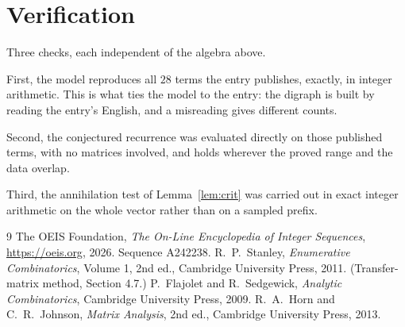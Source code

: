 \documentclass[11pt,a4paper]{article}
\theoremstyle{plain}
\theoremstyle{definition}
\begin{document}
\section{Verification}

Three checks, each independent of the algebra above.

First, the model reproduces all $28$ terms the entry publishes, exactly, in integer
arithmetic. This is what ties the model to the entry: the digraph is built by reading the
entry's English, and a misreading gives different counts.

Second, the conjectured recurrence was evaluated directly on those published terms, with no
matrices involved, and holds wherever the proved range and the data overlap.

Third, the annihilation test of Lemma~\ref{lem:crit} was carried out in exact integer
arithmetic on the whole vector rather than on a sampled prefix.

\begin{thebibliography}{9}
 The OEIS Foundation, \emph{The On-Line Encyclopedia of Integer
Sequences}, \url{https://oeis.org}, 2026. Sequence A242238.
 R.~P.~Stanley, \emph{Enumerative Combinatorics}, Volume 1, 2nd ed.,
Cambridge University Press, 2011. (Transfer-matrix method, Section 4.7.)
 P.~Flajolet and R.~Sedgewick, \emph{Analytic Combinatorics}, Cambridge
University Press, 2009.
 R.~A.~Horn and C.~R.~Johnson, \emph{Matrix Analysis}, 2nd ed., Cambridge
University Press, 2013.
\end{thebibliography}
\end{document}
